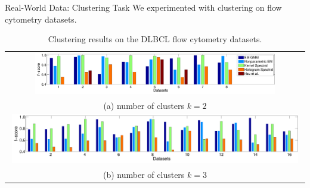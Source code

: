 \documentclass[final,t]{beamer}
\begin{document}
\begin{frame}{}
\begin{columns}[T]
\begin{column}{0.3\linewidth}
    \begin{block}{Real-World Data: Clustering Task}
      We experimented with clustering on flow cytometry datasets. %
      \begin{table}
      \begin{tabular}{c}
        \includegraphics[width=0.82\textwidth]{../experiment/figure_new/paired_bar_chat_k_2} \\[-2mm]
        (a) number of clusters $k=2$ \\[-1mm]
        \includegraphics[width=0.98\textwidth]{../experiment/figure_new/paired_bar_chat_k_3}  \\[-2mm]
        (b) number of clusters $k=3$
      \end{tabular}
      \vspace{-4mm}
      \caption{Clustering results on the DLBCL flow cytometry datasets.}
      \vspace{-3mm}
      \end{table}
    \end{block}
    \end{column}

  \end{columns}
\end{frame}
\end{document}

